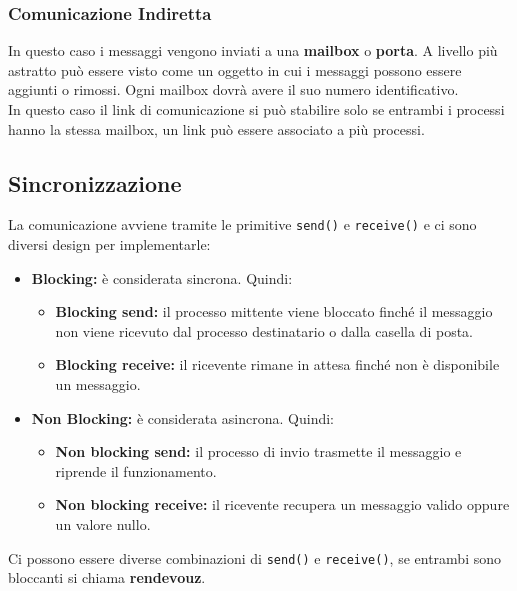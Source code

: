 \subsubsection{Comunicazione Indiretta}
In questo caso i messaggi vengono inviati a una \textbf{mailbox} o \textbf{porta}.
A livello più astratto può essere visto come un oggetto in cui i messaggi possono essere aggiunti o rimossi. Ogni mailbox dovrà avere il suo numero identificativo. \\ 
In questo caso il link di comunicazione si può stabilire solo se entrambi i processi hanno la stessa mailbox, un link può essere associato a più processi.

\subsection{Sincronizzazione}
La comunicazione avviene tramite le primitive \texttt{send()} e \texttt{receive()} e ci sono diversi design per implementarle:
\begin{itemize}
  \item \textbf{Blocking:} è considerata sincrona. Quindi:
    \begin{itemize}
      \item \textbf{Blocking send:} il processo mittente viene bloccato finché il messaggio non viene ricevuto dal processo destinatario o dalla casella di posta.
      \item \textbf{Blocking receive:} il ricevente rimane in attesa finché non è disponibile un messaggio.
    \end{itemize}
  \item \textbf{Non Blocking:} è considerata asincrona. Quindi:
    \begin{itemize}
      \item \textbf{Non blocking send:} il processo di invio trasmette il messaggio e riprende il funzionamento.
      \item \textbf{Non blocking receive:} il ricevente recupera un messaggio valido oppure un valore nullo.
    \end{itemize}
\end{itemize}
Ci possono essere diverse combinazioni di \texttt{send()} e \texttt{receive()}, se entrambi sono bloccanti si chiama \textbf{rendevouz}.


